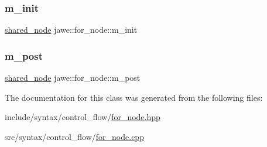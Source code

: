 \mbox{\label{classjawe_1_1for__node_a3ede0b1860eb521ca4d3e0eef422bde9}} 
\subsubsection{\texorpdfstring{m\+\_\+init}{m\_init}}
{\footnotesize\ttfamily \hyperlink{namespacejawe_a3f307481d921b6cbb50cc8511fc2b544}{shared\+\_\+node} jawe\+::for\+\_\+node\+::m\+\_\+init\hspace{0.3cm}{\ttfamily [private]}}

\mbox{\label{classjawe_1_1for__node_a3fe75e2c277af21538197a39a496492b}} 
\subsubsection{\texorpdfstring{m\+\_\+post}{m\_post}}
{\footnotesize\ttfamily \hyperlink{namespacejawe_a3f307481d921b6cbb50cc8511fc2b544}{shared\+\_\+node} jawe\+::for\+\_\+node\+::m\+\_\+post\hspace{0.3cm}{\ttfamily [private]}}



The documentation for this class was generated from the following files\+:\begin{DoxyCompactItemize}
\item 
include/syntax/control\+\_\+flow/\hyperlink{for__node_8hpp}{for\+\_\+node.\+hpp}\item 
src/syntax/control\+\_\+flow/\hyperlink{for__node_8cpp}{for\+\_\+node.\+cpp}\end{DoxyCompactItemize}
